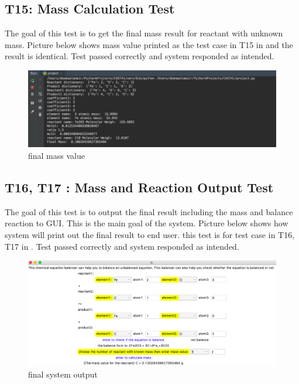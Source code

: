 \documentclass[12pt, titlepage]{article}
\begin{document}
\subsection{T15: Mass Calculation Test}

The goal of this test is to get the final mass result for reactant with unknown mass. Picture below shows mass value printed as the test case in T15 in \cite{UnitVnVPlan} and the result is identical. Test passed correctly and system responded as intended.

\begin{figure}[H]
 \begin{center}
 \includegraphics [width=\textwidth]{mass2}
 \caption{\label{ Figure 22:} final mass value}
 \end{center}
 \end{figure}
 
\subsection{T16, T17 : Mass and Reaction Output Test}

The goal of this test is to output the final result including the mass and balance reaction to GUI. This is the main goal of the system. Picture below shows how system will print out the final result to end user. this test is for  test case in T16, T17 in \cite{UnitVnVPlan}. Test passed correctly and system responded as intended.

\begin{figure}[h!]
 \begin{center}
 \includegraphics [width=\textwidth]{output}
 \caption{\label{ Figure 22:} final system output}
 \end{center}
 \end{figure}
\end{document}
